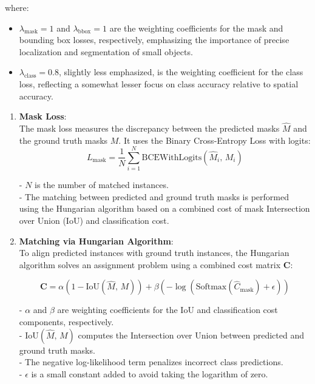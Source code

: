 where:
\begin{itemize}
    \item \( \lambda_{\text{mask}} = 1 \) and \( \lambda_{\text{bbox}} = 1 \) are the weighting coefficients for the mask and bounding box losses, respectively, 
    emphasizing the importance of precise localization and segmentation of small objects.
    \item \( \lambda_{\text{class}} = 0.8 \), slightly less emphasized, is the weighting coefficient for the class loss, reflecting a somewhat lesser focus on class 
    accuracy relative to spatial accuracy.
\end{itemize}

\newpage
\begin{enumerate}
    \item \textbf{Mask Loss}: \\
    The mask loss measures the discrepancy between the predicted masks \( \hat{M} \) and the ground truth masks \( M \). It uses the Binary Cross-Entropy Loss with logits:
    \begin{equation}
        L_{\text{mask}} = \frac{1}{N} \sum_{i=1}^{N} \text{BCEWithLogits}\left( \hat{M}_i, \, M_i \right) \tag{10}
    \end{equation}

    - \( N \) is the number of matched instances. \\
    - The matching between predicted and ground truth masks is performed using the Hungarian algorithm based on a combined cost of mask Intersection over Union (IoU) 
    and classification cost.

    \item \textbf{Matching via Hungarian Algorithm}: \\

    To align predicted instances with ground truth instances, the Hungarian algorithm solves an assignment problem using a combined cost matrix \( \mathbf{C} \):
    
    \begin{equation}
        \mathbf{C} = \alpha \left( 1 - \text{IoU}\left( \hat{M}, \, M \right) \right) + \beta \left( -\log\left( \text{Softmax}\left( \hat{C}_{\text{mask}} \right) + \epsilon \right) \right) \tag{11}
    \end{equation}
    
    - \( \alpha \) and \( \beta \) are weighting coefficients for the IoU and classification cost components, respectively. \\ 
    - \( \text{IoU}\left( \hat{M}, \, M \right) \) computes the Intersection over Union between predicted and ground truth masks. \\
    - The negative log-likelihood term penalizes incorrect class predictions. \\
    - \( \epsilon \) is a small constant added to avoid taking the logarithm of zero. \\


\end{enumerate}
